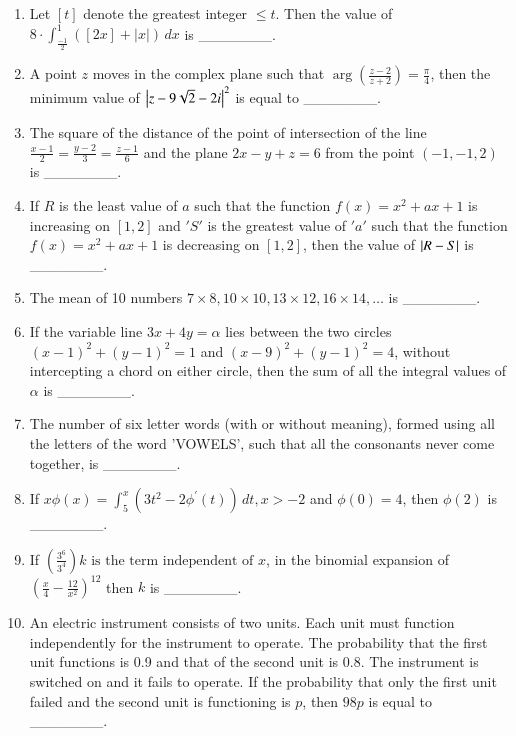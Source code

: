 \documentclass[journal,12pt,onecolumn]{IEEEtran}
\theoremstyle{remark}
\begin{document}
\begin{enumerate}[start=1]
\item Let $[t]$ denote the greatest integer $\leq t$. Then the value of $8 \cdot \int_{\frac{-1}{2}}^{1} \left([2x] + |x| \right)\, dx $
is \_\_\_\_\_\_\_.
\item A point $z$ moves in the complex plane such that 
$\arg\left(\frac{z - 2}{z + 2}\right) = \frac{\pi}{4}$, then the minimum value of $\left\vert z - 9\sqrt{2} - 2i\right\vert^2$ is equal to \_\_\_\_\_\_\_.
\item  The square of the distance of the point of intersection of the line 
$\frac{x - 1}{2} = \frac{y - 2}{3} = \frac{z - 1}{6}$
and the plane $2x - y + z = 6$ from the point $(-1, -1, 2)$ is \_\_\_\_\_\_\_.
\item If $R$ is the least value of $a$ such that the function $f(x) = x^2 + ax + 1$ is increasing on $[1, 2]$ and $'S'$ is the greatest value of $'a'$ such that the function $f(x) = x^2 + ax + 1$ is decreasing on $[1, 2]$, then the value of $\left\vert R - S\right\vert$ is \_\_\_\_\_\_\_.
\item The mean of 10 numbers $7 \times 8, 10 \times 10, 13 \times 12, 16 \times 14, \dots$ is \_\_\_\_\_\_\_.
\item  If the variable line $3x + 4y = \alpha$ lies between the two circles $(x - 1)^2 + (y - 1)^2 = 1$ and $(x - 9)^2 + (y - 1)^2 = 4$, without intercepting a chord on either circle, then the sum of all the integral values of $\alpha$ is \_\_\_\_\_\_\_.
\item The number of six letter words (with or without meaning), formed using all the letters of the word 'VOWELS', such that all the consonants never come together, is \_\_\_\_\_\_\_.
\item If $x\phi(x) =\int_{5}^{x}\left(3t^2 - 2\phi^\prime(t)\right)\, dt, x > -2$
and $\phi(0) = 4$, then $\phi(2)$ is \_\_\_\_\_\_\_.
\item If $\left(\frac{3^6}{3^4}\right)k \text{ is the term independent of } x$, in the binomial expansion of $\left(\frac{x}{4} - \frac{12}{x^2}\right)^{12}
$ then $k$ is \_\_\_\_\_\_\_.
\item An electric instrument consists of two units. Each unit must function independently for the instrument to operate. The probability that the first unit functions is 0.9 and that of the second unit is 0.8. The instrument is switched on and it fails to operate. If the probability that only the first unit failed and the second unit is functioning is $p$, then $98p$ is equal to \_\_\_\_\_\_\_.
\end{enumerate}
\end{document}
